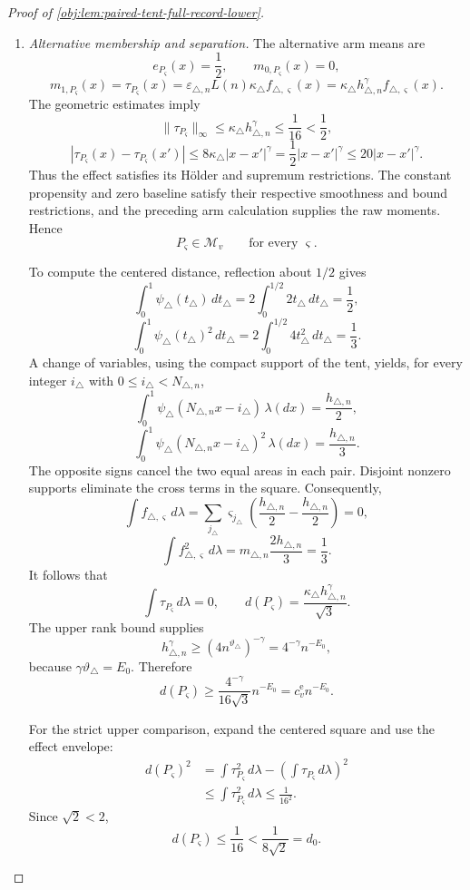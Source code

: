 \documentclass[11pt]{article}
\begin{document}
\begin{proof}[Proof of \cref{obj:lem:paired-tent-full-record-lower}]
\begin{enumerate}
\item \emph{Alternative membership and separation.}
The alternative arm means are
\[
e_{P_\varsigma}(x)=\frac12,
\qquad
m_{0,P_\varsigma}(x)=0,
\]
\[
m_{1,P_\varsigma}(x)=\tau_{P_\varsigma}(x)
=
\varepsilon_{\triangle,n}L(n)\kappa_\triangle
f_{\triangle,\varsigma}(x)
=
\kappa_\triangle h_{\triangle,n}^{\gamma}
f_{\triangle,\varsigma}(x).
\]
The geometric estimates imply
\[
\|\tau_{P_\varsigma}\|_\infty
\le\kappa_\triangle h_{\triangle,n}^{\gamma}
\le\frac1{16}<\frac12,
\]
\[
|\tau_{P_\varsigma}(x)-\tau_{P_\varsigma}(x')|
\le8\kappa_\triangle|x-x'|^\gamma
=\frac12|x-x'|^\gamma
\le20|x-x'|^\gamma.
\]
Thus the effect satisfies its Hölder and supremum restrictions. The constant
propensity and zero baseline satisfy their respective smoothness and bound
restrictions, and the preceding arm calculation supplies the raw moments.
Hence
\[
P_\varsigma\in\mathcal M_v
\qquad\text{for every }\varsigma.
\]

To compute the centered distance, reflection about \(1/2\) gives
\[
\int_0^1\psi_\triangle(t_\triangle)\,dt_\triangle
=
2\int_0^{1/2}2t_\triangle\,dt_\triangle=\frac12,
\]
\[
\int_0^1\psi_\triangle(t_\triangle)^2\,dt_\triangle
=
2\int_0^{1/2}4t_\triangle^2\,dt_\triangle=\frac13.
\]
A change of variables, using the compact support of the tent, yields, for
every integer \(i_\triangle\) with \(0\le i_\triangle<N_{\triangle,n}\),
\[
\int_0^1
\psi_\triangle(N_{\triangle,n}x-i_\triangle)\,\lambda(dx)
=\frac{h_{\triangle,n}}2,
\]
\[
\int_0^1
\psi_\triangle(N_{\triangle,n}x-i_\triangle)^2\,\lambda(dx)
=\frac{h_{\triangle,n}}3.
\]
The opposite signs cancel the two equal areas in each pair. Disjoint nonzero
supports eliminate the cross terms in the square. Consequently,
\[
\int f_{\triangle,\varsigma}\,d\lambda
=
\sum_{j_\triangle}\varsigma_{j_\triangle}
\left(\frac{h_{\triangle,n}}2-\frac{h_{\triangle,n}}2\right)=0,
\]
\[
\int f_{\triangle,\varsigma}^2\,d\lambda
=
m_{\triangle,n}\frac{2h_{\triangle,n}}3=\frac13.
\]
It follows that
\[
\int\tau_{P_\varsigma}\,d\lambda=0,
\qquad
d(P_\varsigma)
=\frac{\kappa_\triangle h_{\triangle,n}^{\gamma}}{\sqrt3}.
\]
The upper rank bound supplies
\[
h_{\triangle,n}^{\gamma}
\ge(4n^{\vartheta_\triangle})^{-\gamma}
=4^{-\gamma}n^{-E_0},
\]
because \(\gamma\vartheta_\triangle=E_0\). Therefore
\[
d(P_\varsigma)\ge
\frac{4^{-\gamma}}{16\sqrt3}n^{-E_0}
=c_v^{\mathrm e}n^{-E_0}.
\]

For the strict upper comparison, expand the centered square and use the
effect envelope:
\[
\begin{aligned}
d(P_\varsigma)^2
&=
\int\tau_{P_\varsigma}^2\,d\lambda
-\left(\int\tau_{P_\varsigma}\,d\lambda\right)^2\\
&\le\int\tau_{P_\varsigma}^2\,d\lambda
\le\frac1{16^2}.
\end{aligned}
\]
Since \(\sqrt2<2\),
\[
d(P_\varsigma)\le\frac1{16}
<\frac1{8\sqrt2}=d_0.
\]


\end{enumerate}
\end{proof}
\end{document}
